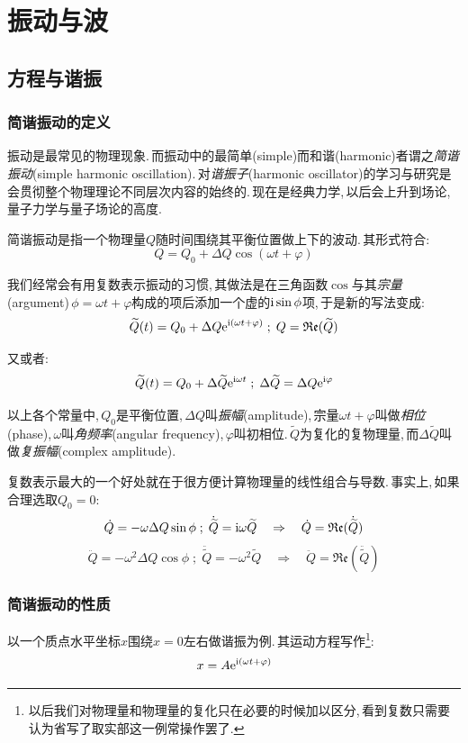 \chapter{振动与波}


\section{方程与谐振}

\subsection{简谐振动的定义}
振动是最常见的物理现象.\,而振动中的最简单(simple)而和谐(harmonic)者谓之\emph{简谐振动}(simple harmonic oscillation).\,对\emph{谐振子}(harmonic oscillator)的学习与研究是会贯彻整个物理理论不同层次内容的始终的.\,现在是经典力学,\,以后会上升到场论,\, 量子力学与量子场论的高度.

简谐振动是指一个物理量$Q$随时间围绕其平衡位置做上下的波动.\,其形式符合:
\[Q=Q_0+\Delta Q\cos(\omega t+\varphi)\]

我们经常会有用复数表示振动的习惯,\,其做法是在三角函数$\cos$与其\emph{宗量}(argument)\,$\phi=\omega t+\varphi$构成的项后添加一个虚的${\rm i} \sin\phi$项,\,于是新的写法变成:
\[\widetilde{Q}(t)=Q_0+\Delta Q{\rm e}^{{\rm i}(\omega t+\varphi)}\; ; \; Q=\mathfrak{Re}(\widetilde{Q})\]

又或者:
\[\widetilde{Q}(t)=Q_0+\Delta \widetilde{Q}{\rm e}^{{\rm i}\omega t}\; ; \; \Delta \widetilde{Q}=\Delta Q{\rm e}^{{\rm i}\varphi}\]

以上各个常量中,\,$Q_0$是平衡位置,\,$\Delta Q$叫\emph{振幅}(amplitude),\,宗量$\omega t+\varphi$叫做\emph{相位}(phase),\,$\omega$叫\emph{角频率}(angular frequency),\,$\varphi$叫初相位.\,$\tilde{Q}$为复化的复物理量,\,而$\Delta \tilde{Q}$叫做\emph{复振幅}(complex amplitude).

复数表示最大的一个好处就在于很方便计算物理量的线性组合与导数.\,事实上,\,如果合理选取$Q_0=0$:
\[\dot{Q}=-\omega\Delta Q\sin\phi\; ; \; \dot{\widetilde{Q}}={\rm i}\omega\widetilde{Q}\quad \Rightarrow\quad \dot{Q}=\mathfrak{Re}(\dot{\widetilde{Q}})\]
\[\ddot{Q}=-\omega^2\Delta Q\cos\phi\; ; \; \ddot{\tilde{Q}}=-\omega^2\tilde{Q}\quad \Rightarrow\quad \ddot{Q}=\mathfrak{Re}(\ddot{\tilde{Q}})\]

\subsection{简谐振动的性质}
以一个质点水平坐标$x$围绕$x=0$左右做谐振为例.\,其运动方程写作\footnote{以后我们对物理量和物理量的复化只在必要的时候加以区分,\,看到复数只需要认为省写了取实部这一例常操作罢了.}:
\[x=A{\rm e}^{{\rm i}(\omega t+\varphi)}\]

